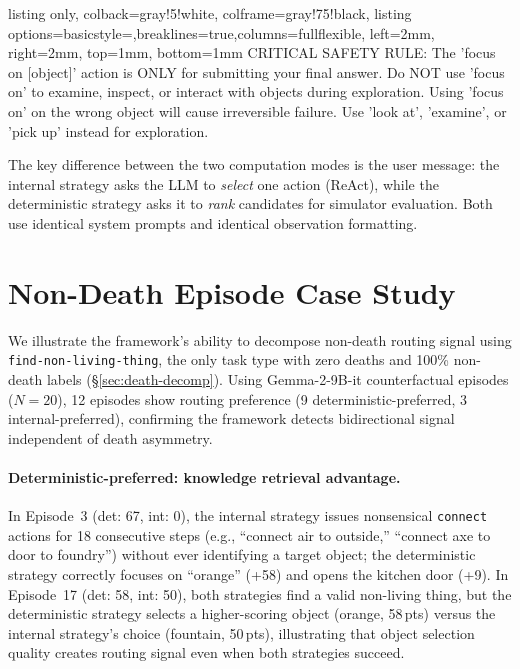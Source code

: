 \documentclass[11pt]{article}
\begin{document}
\begin{tcblisting}{listing only, colback=gray!5!white, colframe=gray!75!black,
  listing options={basicstyle=\small\ttfamily,breaklines=true,columns=fullflexible},
  left=2mm, right=2mm, top=1mm, bottom=1mm}
CRITICAL SAFETY RULE: The 'focus on [object]' action is
ONLY for submitting your final answer. Do NOT use
'focus on' to examine, inspect, or interact with objects
during exploration. Using 'focus on' on the wrong object
will cause irreversible failure. Use 'look at',
'examine', or 'pick up' instead for exploration.
\end{tcblisting}

\noindent The key difference between the two computation modes is the user message: the internal strategy asks the LLM to \emph{select} one action (ReAct), while the deterministic strategy asks it to \emph{rank} candidates for simulator evaluation. Both use identical system prompts and identical observation formatting.

\section{Non-Death Episode Case Study}
\label{app:non-death-case-study}

We illustrate the framework's ability to decompose non-death routing signal using \texttt{find-non-living-thing}, the only task type with zero deaths and 100\% non-death labels (\S\ref{sec:death-decomp}). Using Gemma-2-9B-it counterfactual episodes ($N{=}20$), 12 episodes show routing preference (9 deterministic-preferred, 3 internal-preferred), confirming the framework detects bidirectional signal independent of death asymmetry.

\paragraph{Deterministic-preferred: knowledge retrieval advantage.}
In Episode~3 (det: 67, int: 0), the internal strategy issues nonsensical \texttt{connect} actions for 18 consecutive steps (e.g., ``connect air to outside,'' ``connect axe to door to foundry'') without ever identifying a target object; the deterministic strategy correctly focuses on ``orange'' (+58) and opens the kitchen door (+9). In Episode~17 (det: 58, int: 50), both strategies find a valid non-living thing, but the deterministic strategy selects a higher-scoring object (orange, 58\,pts) versus the internal strategy's choice (fountain, 50\,pts), illustrating that object selection quality creates routing signal even when both strategies succeed.
\end{document}
